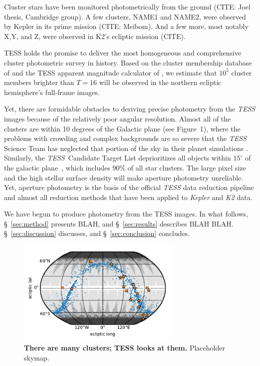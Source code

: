 \documentclass[12pt,twocolumn,tighten]{aastex62}
\begin{document}
Cluster stars have been monitored photometrically from the ground
(CITE: Joel thesis, Cambridge group).
A few clusters, NAME1 and NAME2, were observed by Kepler in its prime
mission (CITE: Meibom).
And a few more, most notably X,Y, and Z, were observed in K2's
ecliptic mission (CITE).

TESS holds the promise to deliver the most homogeneous and
comprehensive cluster photometric survey in history.  Based on the
cluster membership database of \citet{Kharchenko_et_al_2013} and the
TESS apparent magnitude calculator of \citet{Jaffe_Barclay_2017}, we
estimate that $10^5$ cluster members brighter than $T=16$ will be
observed in the northern ecliptic hemisphere's full-frame images.

Yet, there are formidable obstacles to deriving precise photometry
from the {\it TESS} images because of the relatively poor angular
resolution.  Almost all of the clusters are within 10 degrees of the
Galactic plane (see Figure~1), where the problems with crowding and
complex backgrounds are so severe that the {\it TESS}\, Science Team
has neglected that portion of the sky in their planet simulations
\citep{Sullivan_et_al_2015}. Similarly, the {\it TESS}\, Candidate
Target List deprioritizes all objects within $15^\circ$ of the
galactic plane~\citep{stassun_TIC_2018}, which includes 90\% of all
star clusters.  The large pixel size and the high stellar surface
density will make aperture photometry unreliable.  Yet, aperture
photometry is the basis of the official {\it TESS} data reduction
pipeline and almost all reduction methods that have been applied to
{\it Kepler} and {\it K2} data.


We have begun to produce photometry from the TESS images.
In what follows, \S~\ref{sec:method} presents BLAH, and
\S~\ref{sec:results} describes BLAH BLAH.
\S~\ref{sec:discussion} discusses, and \S~\ref{sec:conclusion}
concludes.


\begin{figure}[t]
	\begin{center}
		\leavevmode
		\includegraphics[width=0.7\textwidth]{f1_PLACEHOLDER.pdf}
	\end{center}
	\vspace{-0.5cm}
	\caption{
    {\bf There are many clusters; TESS looks at them.} Placeholder skymap.
		\label{fig:clustermap}
	}
\end{figure}
\end{document}
